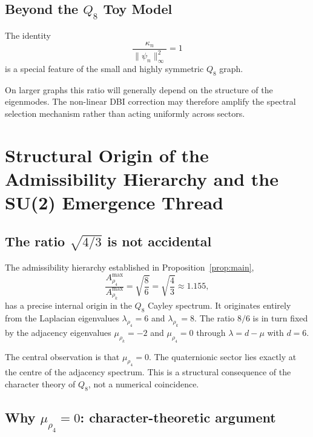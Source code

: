 \documentclass[11pt,a4paper]{article}
\begin{document}
  \subsection{Beyond the $Q_8$ Toy Model}

    The identity
    \[
      \frac{\kappa_n}{\|\psi_n\|_\infty^2}=1
    \]
    is a special feature of the small and highly symmetric $Q_8$ graph.

    On larger graphs this ratio will generally depend on the structure of
    the eigenmodes.
    The non-linear DBI correction may therefore amplify the spectral
    selection mechanism rather than acting uniformly across sectors.

  \section{Structural Origin of the Admissibility Hierarchy and the SU(2) Emergence Thread}
  \label{sec:step4}

  \subsection{The ratio $\sqrt{4/3}$ is not accidental}
    \label{sec:step4-origin}

    The admissibility hierarchy established in Proposition~\ref{prop:main},
    \begin{equation}
      \frac{A^{\max}_{\rho_4}}{A^{\max}_{\rho_k}}
      = \sqrt{\frac{8}{6}} = \sqrt{\frac{4}{3}} \approx 1.155,
      \label{eq:ratio}
    \end{equation}
    has a precise internal origin in the $Q_8$ Cayley spectrum.
    It originates entirely from the Laplacian eigenvalues
    $\lambda_{\rho_4} = 6$ and $\lambda_{\rho_k} = 8$.
    The ratio $8/6$ is in turn fixed by the adjacency eigenvalues
    $\mu_{\rho_k} = -2$ and $\mu_{\rho_4} = 0$ through $\lambda = d - \mu$ with $d = 6$.

    The central observation is that $\mu_{\rho_4} = 0$.
    The quaternionic sector lies exactly at the centre of the adjacency spectrum.
    This is a structural consequence of the character theory of $Q_8$,
    not a numerical coincidence.

  \subsection{Why $\mu_{\rho_4} = 0$: character-theoretic argument}
    \label{sec:step4-character}
\end{document}
